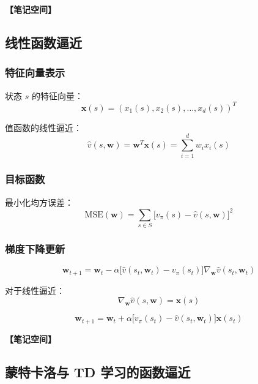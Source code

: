 \documentclass[12pt,a4paper]{article}
\newcommand{\notespace}[1][3cm]{%
  \vspace{#1}%
  \noindent\textbf{【笔记空间】}%
  \vspace{#1}%
}
\newcommand{\1}{\mathbf{1}}
\begin{document}
\notespace[2cm]

\subsection{线性函数逼近}

\subsubsection*{特征向量表示}

状态 $s$ 的特征向量：
\begin{equation}
\mathbf{x}(s)=(x_1(s),x_2(s),\dots,x_d(s))^T
\end{equation}

值函数的线性逼近：
\begin{equation}
\hat{v}(s,\mathbf{w})=\mathbf{w}^T\mathbf{x}(s)=\sum_{i=1}^{d}w_i x_i(s)
\end{equation}

\subsubsection*{目标函数}

最小化均方误差：
\begin{equation}
\mathrm{MSE}(\mathbf{w})=\sum_{s\in S}\bigl[v_\pi(s)-\hat{v}(s,\mathbf{w})\bigr]^2
\end{equation}

\subsubsection*{梯度下降更新}

\begin{equation}
\mathbf{w}_{t+1}=\mathbf{w}_t-\alpha\bigl[\hat{v}(s_t,\mathbf{w}_t)-v_\pi(s_t)\bigr]\nabla_{\mathbf{w}}\hat{v}(s_t,\mathbf{w}_t)
\end{equation}

对于线性逼近：
\begin{equation}
\nabla_{\mathbf{w}}\hat{v}(s,\mathbf{w})=\mathbf{x}(s)
\end{equation}

\begin{equation}
\mathbf{w}_{t+1}=\mathbf{w}_t+\alpha\bigl[v_\pi(s_t)-\hat{v}(s_t,\mathbf{w}_t)\bigr]\mathbf{x}(s_t)
\end{equation}

\notespace[2cm]

\subsection{蒙特卡洛与 TD 学习的函数逼近}
\end{document}
